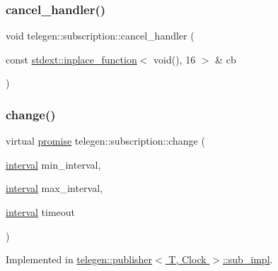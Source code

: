 \subsubsection{\texorpdfstring{cancel\+\_\+handler()}{cancel\_handler()}}
{\footnotesize\ttfamily void telegen\+::subscription\+::cancel\+\_\+handler (\begin{DoxyParamCaption}\item[{const \hyperlink{classstdext_1_1inplace__function}{stdext\+::inplace\+\_\+function}$<$ void(), 16 $>$ \&}]{cb }\end{DoxyParamCaption})\hspace{0.3cm}{\ttfamily [inline]}}

\mbox{\label{classtelegen_1_1subscription_aca992d1891107380ec81a517ea0bde58}} 
\subsubsection{\texorpdfstring{change()}{change()}}
{\footnotesize\ttfamily virtual \hyperlink{namespacetelegen_a9dd802bb5d30cf96b0c616750d43ae86}{promise} telegen\+::subscription\+::change (\begin{DoxyParamCaption}\item[{\hyperlink{namespacetelegen_ad925de2d0a99bc43918533abf0457344}{interval}}]{min\+\_\+interval,  }\item[{\hyperlink{namespacetelegen_ad925de2d0a99bc43918533abf0457344}{interval}}]{max\+\_\+interval,  }\item[{\hyperlink{namespacetelegen_ad925de2d0a99bc43918533abf0457344}{interval}}]{timeout }\end{DoxyParamCaption})\hspace{0.3cm}{\ttfamily [pure virtual]}}



Implemented in \hyperlink{classtelegen_1_1publisher_1_1sub__impl_a2144a27beee3ef15a21fb7fd323b3770}{telegen\+::publisher$<$ T, Clock $>$\+::sub\+\_\+impl}.

\mbox{\label{classtelegen_1_1subscription_a7901d4f487f0a8348a0593cd0787f7f9}} 
